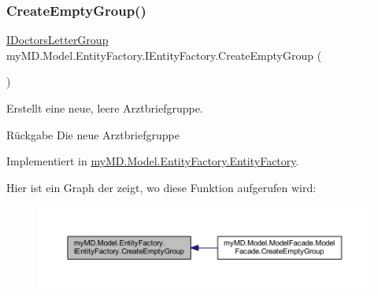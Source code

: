 \subsubsection{\texorpdfstring{Create\+Empty\+Group()}{CreateEmptyGroup()}}
{\footnotesize\ttfamily \mbox{\hyperlink{interfacemy_m_d_1_1_model_interface_1_1_data_model_interface_1_1_i_doctors_letter_group}{I\+Doctors\+Letter\+Group}} my\+M\+D.\+Model.\+Entity\+Factory.\+I\+Entity\+Factory.\+Create\+Empty\+Group (\begin{DoxyParamCaption}{ }\end{DoxyParamCaption})}



Erstellt eine neue, leere Arztbriefgruppe. 

\begin{DoxyReturn}{Rückgabe}
Die neue Arztbriefgruppe
\end{DoxyReturn}


Implementiert in \mbox{\hyperlink{classmy_m_d_1_1_model_1_1_entity_factory_1_1_entity_factory_a0f609feca3acec23373501f96a8f9d69}{my\+M\+D.\+Model.\+Entity\+Factory.\+Entity\+Factory}}.

Hier ist ein Graph der zeigt, wo diese Funktion aufgerufen wird\+:\nopagebreak
\begin{figure}[H]
\begin{center}
\leavevmode
\includegraphics[width=350pt]{interfacemy_m_d_1_1_model_1_1_entity_factory_1_1_i_entity_factory_afca4ecdc59f292073c7a40d258057484_icgraph}
\end{center}
\end{figure}
\mbox{\label{interfacemy_m_d_1_1_model_1_1_entity_factory_1_1_i_entity_factory_a02bf5fe00d1c0b40dbc510ce74619a33}} 
